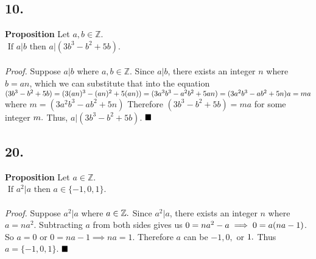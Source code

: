 \documentclass[12pt]{article}
\begin{document}
\begin{minipage}[t]{0.40\textwidth}

\subsection*{10.}

\textbf{Proposition} Let $ a,b\in \mathbb{Z} .$\\
$ \text{ If } a|b \text{ then } a|(3b^3-b^2+5b)$.\\\\
\textit{Proof.} Suppose $ a|b $ where $ a,b\in \mathbb{Z} $. Since $ a|b $, there exists an integer $ n $ where $ b=an $, which we can substitute that into the equation $ (3b^3-b^2+5b) = (3(an)^3-(an)^2+5(an)) \newline =(3a^3b^3-a^2b^2+5an) \newline =(3a^2b^3-ab^2+5n)a \newline =ma$ where $ m=(3a^2b^3-ab^2+5n) $ Therefore $ (3b^3-b^2+5b) =ma $ for some integer $ m. \newline$ Thus, $  a|(3b^3-b^2+5b) $.
$ \hfill\blacksquare $

\subsection*{20.}
\textbf{Proposition} Let $ a\in \mathbb{Z} .$\\
$ \text{ If } a^2|a \text{ then }a\in\{-1,0,1\} $.\\\\
\textit{Proof.} Suppose $ a^2|a$ where $  a\in \mathbb{Z}.\newline $
Since $ a^2|a $, there exists an integer $ n $ where $ a=na^2 $. Subtracting $ a $ from both sides gives us $ 0=na^2-a \newline \implies 0=a(na-1) $. So $ a=0 $ or $ 0=na-1 \implies na=1$. Therefore $ a $ can be $ -1,0,$ or $1 . \newline$ Thus $ a=\{-1,0,1\}.$
$\hfill\blacksquare$



\end{minipage}
\hfill\vline\hfill
\end{document}
